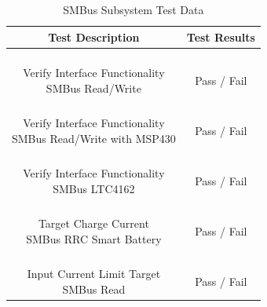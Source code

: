 \documentclass[12pt]{article}
\begin{document}
\begin{appendices}
\begin{table}[h!]
\centering
\caption*{SMBus Subsystem Test Data}
\begin{tabular}{ | c | c | }
\hline
\textbf{Test Description} & \textbf{Test Results} \\
\hline
\parbox{0.5\linewidth}{\raggedright \hfill \\[-0.25 em]
Verify Interface Functionality\\
SMBus Read/Write
\hfill \\[0.1 em]} &  \parbox{0.4\linewidth}{\centering \hfill \\ [0.7 em] 
Pass \space / \space  Fail \hfill \\ [0.3 em]} \\ 
\hline
\parbox{0.5\linewidth}{\raggedright \hfill \\[-0.25 em]
Verify Interface Functionality\\
SMBus Read/Write with MSP430
\hfill \\[0.1 em]} &  \parbox{0.4\linewidth}{\centering \hfill \\ [0.7 em] 
Pass \space / \space  Fail \hfill \\ [0.3 em]} \\ 
\hline
\parbox{0.5\linewidth}{\raggedright \hfill \\[-0.25 em]
Verify Interface Functionality\\
SMBus LTC4162
\hfill \\[0.1 em]} &  \parbox{0.4\linewidth}{\centering \hfill \\ [0.7 em] 
Pass \space / \space  Fail \hfill \\ [0.3 em]} \\ 
\hline
\parbox{0.5\linewidth}{\raggedright \hfill \\[-0.25 em]
Target Charge Current\\
SMBus RRC Smart Battery
\hfill \\[0.1 em]} &  \parbox{0.4\linewidth}{\centering \hfill \\ [0.7 em] 
Pass \space / \space  Fail \hfill \\ [0.3 em]} \\ 
\hline
\parbox{0.5\linewidth}{\raggedright \hfill \\[-0.25 em]
Input Current Limit Target\\
SMBus Read
\hfill \\[0.1 em]} &  \parbox{0.4\linewidth}{\centering \hfill \\ [0.7 em] 
Pass \space / \space  Fail \hfill \\ [0.3 em]} \\ 
\hline
\end{tabular}
\end{table}


\end{appendices}
\end{document}
